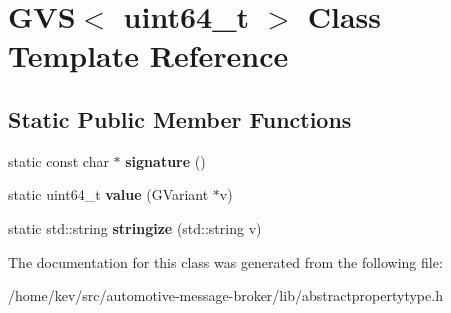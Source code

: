 \hypertarget{classGVS_3_01uint64__t_01_4}{\section{G\+V\+S$<$ uint64\+\_\+t $>$ Class Template Reference}
\label{classGVS_3_01uint64__t_01_4}
}
\subsection*{Static Public Member Functions}
\begin{DoxyCompactItemize}
\item 
\hypertarget{classGVS_3_01uint64__t_01_4_af3a581bec16849dd09e5a46a68ee5c9a}{static const char $\ast$ {\bfseries signature} ()}\label{classGVS_3_01uint64__t_01_4_af3a581bec16849dd09e5a46a68ee5c9a}

\item 
\hypertarget{classGVS_3_01uint64__t_01_4_a2d48a0a60faa407a338bf886f8120e44}{static uint64\+\_\+t {\bfseries value} (G\+Variant $\ast$v)}\label{classGVS_3_01uint64__t_01_4_a2d48a0a60faa407a338bf886f8120e44}

\item 
\hypertarget{classGVS_3_01uint64__t_01_4_a85e2ae3bd54dd831724a7cda94bcf5cb}{static std\+::string {\bfseries stringize} (std\+::string v)}\label{classGVS_3_01uint64__t_01_4_a85e2ae3bd54dd831724a7cda94bcf5cb}

\end{DoxyCompactItemize}


The documentation for this class was generated from the following file\+:\begin{DoxyCompactItemize}
\item 
/home/kev/src/automotive-\/message-\/broker/lib/abstractpropertytype.\+h\end{DoxyCompactItemize}
